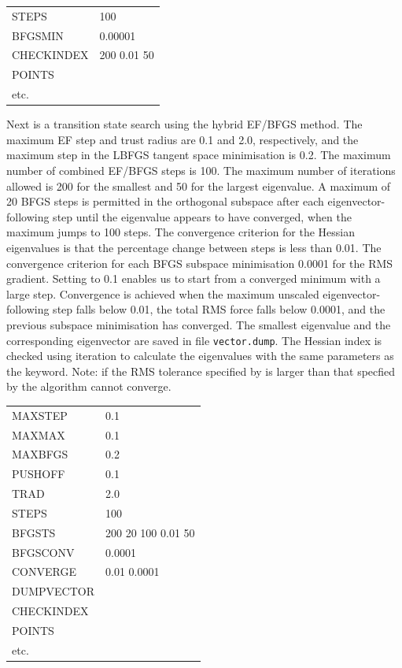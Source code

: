 {{{\medskip
\begin{tabular}{ll}
 STEPS & 100 \\
 BFGSMIN & 0.00001 \\
 CHECKINDEX & 200 0.01 50 \\
 POINTS \\
 etc. \\
\end{tabular}
\medskip

\noindent Next is a transition state search using the hybrid EF/BFGS method. The maximum EF
step and trust radius are 0.1 and 2.0, respectively,
and the maximum step in the LBFGS tangent space minimisation is 0.2. The maximum number of combined
EF/BFGS steps is 100. The maximum number of iterations allowed is
200 for the smallest and 50 for the largest eigenvalue. A maximum of 20 BFGS steps 
is permitted in
the orthogonal subspace after each eigenvector-following step until the eigenvalue
appears to have converged, when the maximum jumps to 100 steps.
The convergence criterion
for the Hessian eigenvalues is that the percentage change between steps is
less than 0.01. The convergence criterion for each BFGS
subspace minimisation 0.0001 for the RMS gradient.
Setting {} to 0.1 enables us to start from a converged minimum with
a large step.
Convergence is achieved when the maximum unscaled eigenvector-following step
falls below 0.01, the total RMS force falls below 0.0001, and the previous subspace
minimisation has converged. The smallest eigenvalue and the corresponding eigenvector
are saved in file {\tt vector.dump}. The Hessian index is checked using iteration to
calculate the eigenvalues with the same parameters as the {} keyword.
Note: if the RMS tolerance specified by {} is larger than that specfied by
{ \/} the algorithm cannot converge.

\medskip
\begin{tabular}{ll}
 MAXSTEP & 0.1 \\
 MAXMAX  & 0.1 \\
 MAXBFGS & 0.2 \\
 PUSHOFF & 0.1 \\
 TRAD & 2.0 \\
 STEPS & 100 \\
 BFGSTS & 200 20 100 0.01 50 \\
 BFGSCONV & 0.0001 \\
 CONVERGE & 0.01 0.0001 \\
 DUMPVECTOR \\
 CHECKINDEX \\
 POINTS \\
 etc. \\
\end{tabular}
\medskip

}}}
